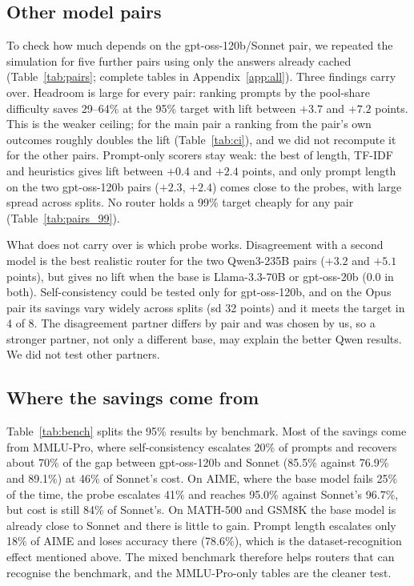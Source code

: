 \documentclass[11pt]{article}
\begin{document}
\subsection{Other model pairs}\label{sec:pairs}
To check how much depends on the gpt-oss-120b/Sonnet pair, we repeated the simulation for five further pairs using only the answers already cached (Table~\ref{tab:pairs}; complete tables in Appendix~\ref{app:all}). Three findings carry over. Headroom is large for every pair: ranking prompts by the pool-share difficulty saves 29--64\% at the 95\% target with lift between $+3.7$ and $+7.2$ points. This is the weaker ceiling; for the main pair a ranking from the pair's own outcomes roughly doubles the lift (Table~\ref{tab:ci}), and we did not recompute it for the other pairs. Prompt-only scorers stay weak: the best of length, TF-IDF and heuristics gives lift between $+0.4$ and $+2.4$ points, and only prompt length on the two gpt-oss-120b pairs ($+2.3$, $+2.4$) comes close to the probes, with large spread across splits. No router holds a 99\% target cheaply for any pair (Table~\ref{tab:pairs_99}).

What does not carry over is which probe works. Disagreement with a second model is the best realistic router for the two Qwen3-235B pairs ($+3.2$ and $+5.1$ points), but gives no lift when the base is Llama-3.3-70B or gpt-oss-20b ($0.0$ in both). Self-consistency could be tested only for gpt-oss-120b, and on the Opus pair its savings vary widely across splits (sd 32 points) and it meets the target in 4 of 8. The disagreement partner differs by pair and was chosen by us, so a stronger partner, not only a different base, may explain the better Qwen results. We did not test other partners.



\subsection{Where the savings come from}
Table~\ref{tab:bench} splits the 95\% results by benchmark. Most of the savings come from MMLU-Pro, where self-consistency escalates 20\% of prompts and recovers about 70\% of the gap between gpt-oss-120b and Sonnet (85.5\% against 76.9\% and 89.1\%) at 46\% of Sonnet's cost. On AIME, where the base model fails 25\% of the time, the probe escalates 41\% and reaches 95.0\% against Sonnet's 96.7\%, but cost is still 84\% of Sonnet's. On MATH-500 and GSM8K the base model is already close to Sonnet and there is little to gain. Prompt length escalates only 18\% of AIME and loses accuracy there (78.6\%), which is the dataset-recognition effect mentioned above. The mixed benchmark therefore helps routers that can recognise the benchmark, and the MMLU-Pro-only tables are the cleaner test.
\end{document}
